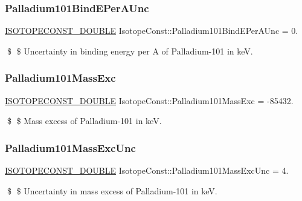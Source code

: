 \subsubsection{\texorpdfstring{Palladium101\+Bind\+E\+Per\+A\+Unc}{Palladium101BindEPerAUnc}}
{\footnotesize\ttfamily \mbox{\hyperlink{group___isotope_const-_macros_ga8f45a7272ce02c0b4c65c44636ed719a}{I\+S\+O\+T\+O\+P\+E\+C\+O\+N\+S\+T\+\_\+\+D\+O\+U\+B\+LE}} Isotope\+Const\+::\+Palladium101\+Bind\+E\+Per\+A\+Unc = 0.}

\$ \$ Uncertainty in binding energy per A of Palladium-\/101 in keV. \mbox{\label{group___isotope_const-_palladium-_pd101_ga08d7e316cc28b205bf5ae3582be6207d}} 
\subsubsection{\texorpdfstring{Palladium101\+Mass\+Exc}{Palladium101MassExc}}
{\footnotesize\ttfamily \mbox{\hyperlink{group___isotope_const-_macros_ga8f45a7272ce02c0b4c65c44636ed719a}{I\+S\+O\+T\+O\+P\+E\+C\+O\+N\+S\+T\+\_\+\+D\+O\+U\+B\+LE}} Isotope\+Const\+::\+Palladium101\+Mass\+Exc = -\/85432.}

\$ \$ Mass excess of Palladium-\/101 in keV. \mbox{\label{group___isotope_const-_palladium-_pd101_ga1604b92606f6e2862cc87dabf8417b80}} 
\subsubsection{\texorpdfstring{Palladium101\+Mass\+Exc\+Unc}{Palladium101MassExcUnc}}
{\footnotesize\ttfamily \mbox{\hyperlink{group___isotope_const-_macros_ga8f45a7272ce02c0b4c65c44636ed719a}{I\+S\+O\+T\+O\+P\+E\+C\+O\+N\+S\+T\+\_\+\+D\+O\+U\+B\+LE}} Isotope\+Const\+::\+Palladium101\+Mass\+Exc\+Unc = 4.}

\$ \$ Uncertainty in mass excess of Palladium-\/101 in keV. \mbox{\label{group___isotope_const-_palladium-_pd101_gaa26c8b95bdb2304a75473ee44ab61cf3}} 
